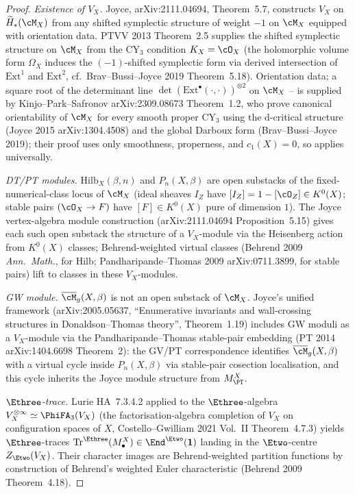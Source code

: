 \begin{proof}
\emph{Existence of $V_X$.} Joyce, arXiv:2111.04694, Theorem~5.7, constructs
$V_X$ on $\widetilde H_*(\cM_X)$ from any shifted symplectic structure of
weight $-1$ on $\cM_X$ equipped with orientation data. PTVV 2013 Theorem~2.5
supplies the shifted symplectic structure on $\cM_X$ from the CY$_3$
condition $K_X = \cO_X$ (the holomorphic volume form $\Omega_X$ induces
the $(-1)$-shifted symplectic form via derived intersection of
$\mathrm{Ext}^1$ and $\mathrm{Ext}^2$, cf.\ Brav--Bussi--Joyce 2019
Theorem~5.18). Orientation data; a square root of the determinant
line $\det(\mathrm{Ext}^\bullet(\cdot, \cdot))^{\otimes 2}$ on $\cM_X$ --
is supplied by Kinjo--Park--Safronov arXiv:2309.08673 Theorem~1.2, who
prove canonical orientability of $\cM_X$ for every smooth proper CY$_3$
using the d-critical structure (Joyce 2015 arXiv:1304.4508) and the
global Darboux form (Brav--Bussi--Joyce 2019); their proof uses only
smoothness, properness, and $c_1(X) = 0$, so applies universally.

\emph{DT/PT modules.} $\mathrm{Hilb}_X(\beta, n)$ and $P_n(X, \beta)$ are
open substacks of the fixed-numerical-class locus of $\cM_X$ (ideal
sheaves $I_Z$ have $[I_Z] = 1 - [\cO_Z]\in K^0(X)$; stable pairs
$(\cO_X\to F)$ have $[F]\in K^0(X)$ pure of dimension $1$). The Joyce
vertex-algebra module construction (arXiv:2111.04694 Proposition~5.15)
gives each such open substack the structure of a $V_X$-module via the
Heisenberg action from $K^0(X)$ classes; Behrend-weighted virtual classes
(Behrend 2009 \emph{Ann.\ Math.}, for $\mathrm{Hilb}$; Pandharipande--Thomas
2009 arXiv:0711.3899, for stable pairs) lift to classes in these
$V_X$-modules.

\emph{GW module.} $\overline\cM_g(X, \beta)$ is not an open substack of
$\cM_X$. Joyce's unified framework (arXiv:2005.05637, ``Enumerative
invariants and wall-crossing structures in Donaldson--Thomas theory'',
Theorem~1.19) includes GW moduli as a $V_X$-module via the
Pandharipande--Thomas stable-pair embedding (PT 2014 arXiv:1404.6698
Theorem~2): the GV/PT correspondence identifies
$\overline\cM_g(X, \beta)$ with a virtual cycle inside
$P_n(X, \beta)$ via stable-pair cosection localisation, and this cycle
inherits the Joyce module structure from $M_{\PT}^X$.

\emph{$\Ethree$-trace.} Lurie HA~7.3.4.2 applied to the $\Ethree$-algebra
$V_X^{\otimes\infty}\simeq \PhiFA_3(V_X)$ (the factorisation-algebra
completion of $V_X$ on configuration spaces of $X$, Costello--Gwilliam
2021 Vol.~II Theorem~4.7.3) yields $\Ethree$-traces
$\mathrm{Tr}^{\Ethree}(M_\bullet^X) \in \End^{\Etwo}(\mathbf{1})$ landing in
the $\Etwo$-centre $Z_{\Etwo}(V_X)$. Their character images are
Behrend-weighted partition functions by construction of Behrend's weighted
Euler characteristic (Behrend 2009 Theorem~4.18).


\end{proof}
